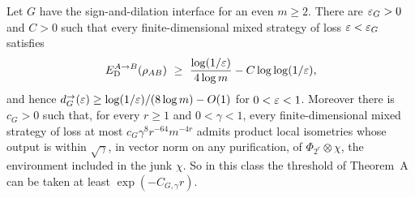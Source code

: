 \begin{theorem}\label{thm:floor-class}
Let $G$ have the sign-and-dilation interface for an even $m\ge2$. There are $\varepsilon_G>0$ and $C>0$ such that every
finite-dimensional mixed strategy of loss $\varepsilon<\varepsilon_G$ satisfies
\[
\ED^{A\to B}(\rho_{AB})\ \ge\ \frac{\log(1/\eps)}{4\log m}-C\log\log(1/\eps),
\]
and hence $d^\to_G(\varepsilon)\ge\log(1/\varepsilon)/(8\log m)-O(1)$ for $0<\varepsilon<1$. Moreover there is $c_G>0$ such that, for every $r\ge1$ and
$0<\gamma<1$, every finite-dimensional mixed strategy of loss at most $c_G\gamma^8r^{-64}m^{-4r}$ admits product local isometries
whose output is within $\sqrt\gamma$, in vector norm on any purification, of $\Phi_{2^r}\otimes\chi$, the environment included in the
junk $\chi$. So in this class the threshold of Theorem~A can be taken at least $\exp(-C_{G,\gamma}r)$.
\end{theorem}

